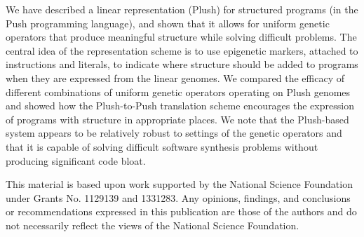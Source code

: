 \documentclass[graybox]{svmult}
\begin{document}
We have described a linear representation (Plush) for structured programs (in the Push programming language), and shown that it allows for uniform genetic operators that produce meaningful structure while solving difficult problems. The central idea of the representation scheme is to use epigenetic markers, attached to instructions and literals, to indicate where structure should be added to programs when they are expressed from the linear genomes. We compared the efficacy of different combinations of uniform genetic operators operating on Plush genomes and showed how the Plush-to-Push translation scheme encourages the expression of programs with structure in appropriate places. We note that the Plush-based system appears to be relatively robust to settings of the genetic operators and that it is capable of solving difficult software synthesis problems without producing significant code bloat.



\begin{acknowledgement}
This material is based upon work supported by the National Science Foundation under Grants No. 1129139 and 1331283. Any opinions, findings, and conclusions or recommendations expressed in this publication are those of the authors and do not necessarily reflect the views of the National Science Foundation.
\end{acknowledgement}


\end{document}
